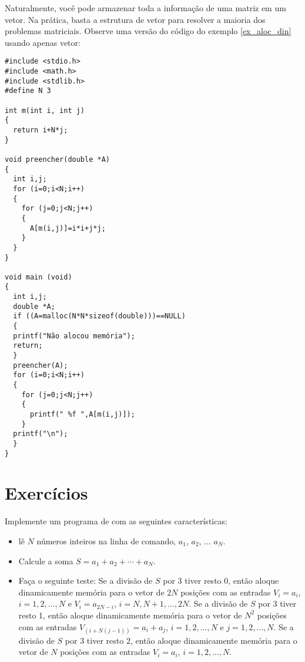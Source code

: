 Naturalmente, você pode armazenar toda a informação de uma matriz em um vetor. Na prática, basta a estrutura de vetor para resolver a maioria dos problemas matriciais. Observe uma versão do código do exemplo \ref{ex_aloc_din} usando apenas vetor:
\begin{verbatim}
#include <stdio.h>
#include <math.h>
#include <stdlib.h>
#define N 3

int m(int i, int j)
{
  return i+N*j;
}

void preencher(double *A)
{
  int i,j;
  for (i=0;i<N;i++)
  {
    for (j=0;j<N;j++)
    {
      A[m(i,j)]=i*i+j*j;
    }
  }
}

void main (void)
{
  int i,j;
  double *A;
  if ((A=malloc(N*N*sizeof(double)))==NULL)
  {
  printf("Não alocou memória");
  return;
  }
  preencher(A);
  for (i=0;i<N;i++)
  {
    for (j=0;j<N;j++)
    {
      printf(" %f ",A[m(i,j)]);
    }
  printf("\n");
  }  
}
\end{verbatim}


\section{Exercícios}
\begin{exer}
Implemente um programa de com as seguintes características: 
\begin{itemize}
\item lê $N$ números inteiros na linha de comando, $a_1$, $a_2$, ... $a_N$.
\item Calcule a soma $S=a_1+a_2+\cdots+a_N$.
\item Faça o seguinte teste:
\subitem Se a divisão de $S$ por 3 tiver resto 0, então aloque dinamicamente memória para o vetor de $2N$ posições com as entradas $V_{i}=a_i$, $i=1,2,...,N$ e $V_{i}=a_{2N-i}$, $i=N,N+1,...,2N$.
\subitem Se a divisão de $S$ por 3 tiver resto 1, então aloque dinamicamente memória para o vetor de $N^2$ posições com as entradas $V_{(i+N(j-1))}=a_i+a_j$, $i=1,2,...,N$ e $j=1,2,...,N$.
\subitem Se a divisão de $S$ por 3 tiver resto 2, então aloque dinamicamente memória para o vetor de $N$ posições com as entradas $V_{i}=a_i$, $i=1,2,...,N$.
\end{itemize}
\end{exer}

